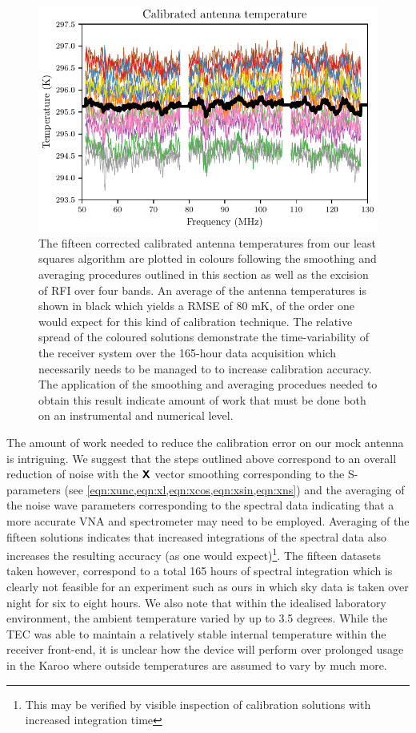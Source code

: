 \begin{figure}
    \centering
    \includegraphics[width=.8\textwidth]{nima_result}
    \caption{The fifteen corrected calibrated antenna temperatures from our least squares algorithm are plotted in colours following the smoothing and averaging procedures outlined in this section as well as the excision of RFI over four bands. An average of the antenna temperatures is shown in black which yields a RMSE of 80 mK, of the order one would expect for this kind of calibration technique. The relative spread of the coloured solutions demonstrate the time-variability of the receiver system over the 165-hour data acquisition which necessarily needs to be managed to to increase calibration accuracy. The application of the smoothing and averaging procedues needed to obtain this result indicate amount of work that must be done both on an instrumental and numerical level.}
    \label{fig:nima_result}
\end{figure}

The amount of work needed to reduce the calibration error on our mock antenna is intriguing. We suggest that the steps outlined above correspond to an overall reduction of noise with the $\textbf{\textsf{X}}$ vector smoothing corresponding to the S-parameters (see \cref{eqn:xunc,eqn:xl,eqn:xcos,eqn:xsin,eqn:xns}) and the averaging of the noise wave parameters corresponding to the spectral data indicating that a more accurate VNA and spectrometer may need to be employed. Averaging of the fifteen solutions indicates that increased integrations of the spectral data also increases the resulting accuracy (as one would expect)\footnote{This may be verified by visible inspection of calibration solutions with increased integration time}. The fifteen datasets taken however, correspond to a total 165 hours of spectral integration which is clearly not feasible for an experiment such as ours in which sky data is taken over night for six to eight hours. We also note that within the idealised laboratory environment, the ambient temperature varied by up to 3.5 degrees. While the TEC was able to maintain a relatively stable internal temperature within the receiver front-end, it is unclear how the device will perform over prolonged usage in the Karoo where outside temperatures are assumed to vary by much more. 

